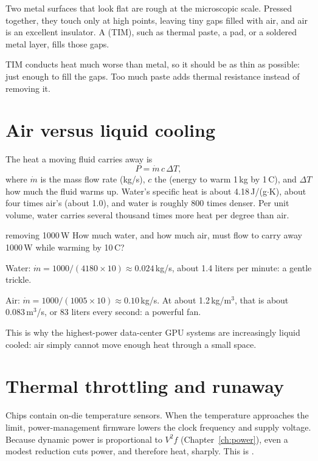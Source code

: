 Two metal surfaces that look flat are rough at the microscopic scale. Pressed together, they touch only at high points, leaving tiny gaps filled with air, and air is an excellent insulator. A  (TIM), such as thermal paste, a pad, or a soldered metal layer, fills those gaps.

TIM conducts heat much worse than metal, so it should be as thin as possible: just enough to fill the gaps. Too much paste adds thermal resistance instead of removing it.

\section{Air versus liquid cooling}

The heat a moving fluid carries away is
\[
  P = \dot m\, c\, \Delta T,
\]
where $\dot m$ is the mass flow rate (kg/s), $c$ the  (energy to warm 1\,kg by 1\,\textdegree C), and $\Delta T$ how much the fluid warms up. Water's specific heat is about 4.18\,J/(g$\cdot$K), about four times air's (about 1.0), and water is roughly 800 times denser. Per unit volume, water carries several thousand times more heat per degree than air.

\begin{worked}{removing 1000\,W}
How much water, and how much air, must flow to carry away 1000\,W while warming by 10\,\textdegree C?

Water: $\dot m = 1000/(4180 \times 10) \approx 0.024$\,kg/s, about 1.4 liters per minute: a gentle trickle.

Air: $\dot m = 1000/(1005 \times 10) \approx 0.10$\,kg/s. At about 1.2\,kg/m$^3$, that is about 0.083\,m$^3$/s, or 83 liters every second: a powerful fan.
\end{worked}

This is why the highest-power data-center GPU systems are increasingly liquid cooled: air simply cannot move enough heat through a small space.

\section{Thermal throttling and runaway}

Chips contain on-die temperature sensors. When the temperature approaches the limit, power-management firmware lowers the clock frequency and supply voltage. Because dynamic power is proportional to $V^2 f$ (Chapter~\ref{ch:power}), even a modest reduction cuts power, and therefore heat, sharply. This is .

